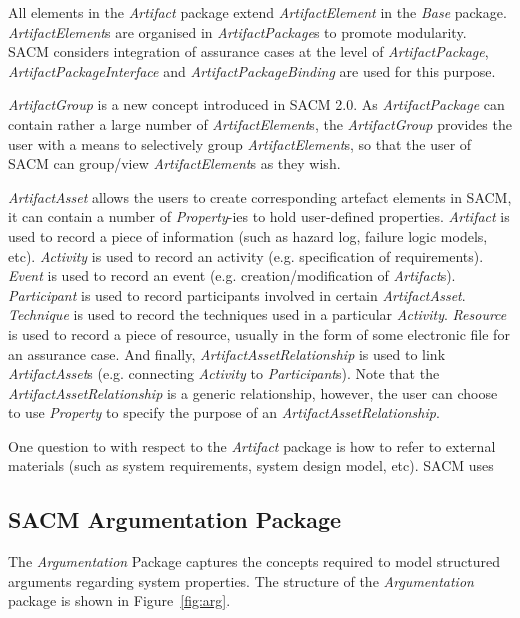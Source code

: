 All elements in the \textit{Artifact} package extend \textit{ArtifactElement} in the \textit{Base} package. \textit{ArtifactElement}s are organised in \textit{ArtifactPackage}s to promote modularity. SACM considers integration of assurance cases at the level of \textit{ArtifactPackage}, \textit{ArtifactPackageInterface} and \textit{ArtifactPackageBinding} are used for this purpose.

\textit{ArtifactGroup} is a new concept introduced in SACM 2.0. As \textit{ArtifactPackage} can contain rather a large number of \textit{ArtifactElement}s, the \textit{ArtifactGroup} provides the user with a means to selectively group \textit{ArtifactElement}s, so that the user of SACM can group/view \textit{ArtifactElement}s as they wish.

\textit{ArtifactAsset} allows the users to create corresponding artefact elements in SACM, it can contain a number of \textit{Property}-ies to hold user-defined properties. \textit{Artifact} is used to record a piece of information (such as hazard log, failure logic models, etc). \textit{Activity} is used to record an activity (e.g. specification of requirements). \textit{Event} is used to record an event (e.g. creation/modification of \textit{Artifact}s). \textit{Participant} is used to record participants involved in certain \textit{ArtifactAsset}. \textit{Technique} is used to record the techniques used in a particular \textit{Activity}. \textit{Resource} is used to record a piece of resource, usually in the form of some electronic file for an assurance case. And finally, \textit{ArtifactAssetRelationship} is used to link \textit{ArtifactAsset}s (e.g. connecting \textit{Activity} to \textit{Participant}s). Note that the \textit{ArtifactAssetRelationship} is a generic relationship, however, the user can choose to use \textit{Property} to specify the purpose of an \textit{ArtifactAssetRelationship}. 

One question to with respect to the \textit{Artifact} package is how to refer to external materials (such as system requirements, system design model, etc). SACM uses  

\subsection{SACM Argumentation Package}
\label{sec:argPack}
The \textit{Argumentation} Package captures the concepts required to model structured arguments regarding system properties. The structure of the \textit{Argumentation} package is shown in Figure~\ref{fig:arg}. 

